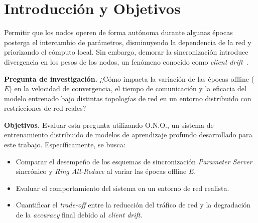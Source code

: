 
\section{Introducción y Objetivos}

Permitir que los nodos operen de forma autónoma durante algunas épocas posterga el intercambio de parámetros, disminuyendo la dependencia de la red y priorizando el cómputo local. Sin embargo, demorar la sincronización introduce divergencia en los pesos de los nodos, un fenómeno conocido como \emph{client drift}~\cite{mcmahan2017federated}.

\textbf{Pregunta de investigación.} ¿Cómo impacta la variación de las épocas offline ($E$) en la velocidad de convergencia, el tiempo de comunicación y la eficacia del modelo entrenado bajo distintas topologías de red en un entorno distribuido con restricciones de red reales?

\textbf{Objetivos.} Evaluar esta pregunta utilizando O.N.O., un sistema de entrenamiento distribuido de modelos de aprendizaje profundo desarrollado para este trabajo. Específicamente, se busca:

\begin{itemize}
    \item Comparar el desempeño de los esquemas de sincronización \emph{Parameter Server} sincrónico y \emph{Ring All-Reduce} al variar las épocas offline $E$.
    \item Evaluar el comportamiento del sistema en un entorno de red realista.
    \item Cuantificar el \emph{trade-off} entre la reducción del tráfico de red y la degradación de la \emph{accuracy} final debido al \emph{client drift}.
\end{itemize}

